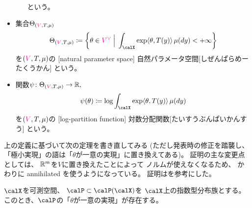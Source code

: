 \documentclass[report]{jlreq}
\begin{document}
\begin{definition}[指数型分布族]
\begin{itemize}
\begin{itemize}
                    という。
            \end{itemize}
        \item 集合$\Theta_{(\textcolor{magenta}{V}, T, \mu)}$
            \begin{equation}
                \Theta_{(\highlight{V}, T, \mu)}
                    \coloneqq \mybrace{
                        \theta \in \highlight{V^\vee}
                        \;\Big|\;
                        \int_\calX \exp \langle \theta, T(y) \rangle \, \mu(dy) < +\infty
                    }
            \end{equation}
            を$(\textcolor{magenta}{V}, T, \mu)$の
            [natural parameter space]
            {自然パラメータ空間}[しぜんぱらめーたくうかん]
            という。
        \item 関数$\psi \colon \Theta_{(\textcolor{magenta}{V}, T, \mu)} \to \mathbb{R},$
            \begin{equation}
                \psi(\theta)
                    \coloneqq
                    \log \int_\calX \exp \langle \theta, T(y) \rangle \, \mu(dy)
            \end{equation}
            を$(\textcolor{magenta}{V}, T, \mu)$の
            [log-partition function]
            {対数分配関数}[たいすうぶんぱいかんすう]
            という。
    \end{itemize}
\end{definition}

上の定義に基づいて次の定理を書き直してみる
(ただし発表時の修正を踏襲し、「極小実現」の語は「$\theta$が一意の実現」に置き換えてある)。
証明の主な変更点としては、
$\mathbb{R}^m$を$V$に置き換えたことによって
ノルムが使えなくなるため、
かわりに annihilated を使うようになっている。
証明は\cite[Lemma 21]{bn1970_pdf}を参考にした。

\begin{theorem}
    $\calX$を可測空間、
    $\calP \subset \calP(\calX)$を
    $\calX$上の指数型分布族とする。
    このとき、$\calP$の「$\theta$が一意の実現」が存在する。
\end{theorem}
\end{document}

